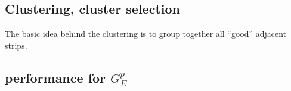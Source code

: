 \subsection{Clustering, cluster selection}
\label{clustering}

The basic idea behind the clustering is to group together all ``good'' adjacent strips.

\subsection{performance for $G_E^p$}

%
%
%
%

%
%
%
